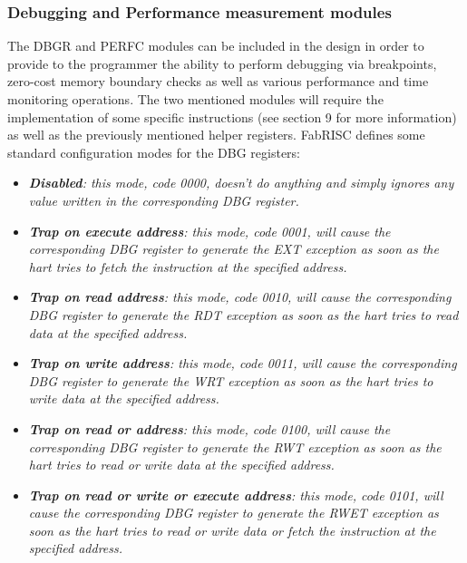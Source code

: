         \subsubsection{Debugging and Performance measurement modules}

            The DBGR and PERFC modules can be included in the design in order to provide to the programmer the ability to perform debugging via breakpoints, zero-cost memory boundary checks as well as various performance and time monitoring operations. The two mentioned modules will require the implementation of some specific instructions (see section 9 for more information) as well as the previously mentioned helper registers. FabRISC defines some standard configuration modes for the DBG registers:

            \begin{itemize}

                \item \textit{\textbf{Disabled}: this mode, code 0000, doesn't do anything and simply ignores any value written in the corresponding DBG register.}

                \item \textit{\textbf{Trap on execute address}: this mode, code 0001, will cause the corresponding DBG register to generate the EXT exception as soon as the hart tries to fetch the instruction at the specified address.}

                \item \textit{\textbf{Trap on read address}: this mode, code 0010, will cause the corresponding DBG register to generate the RDT exception as soon as the hart tries to read data at the specified address.}

                \item \textit{\textbf{Trap on write address}: this mode, code 0011, will cause the corresponding DBG register to generate the WRT exception as soon as the hart tries to write data at the specified address.}

                \item \textit{\textbf{Trap on read or address}: this mode, code 0100, will cause the corresponding DBG register to generate the RWT exception as soon as the hart tries to read or write data at the specified address.}

                \item \textit{\textbf{Trap on read or write or execute address}: this mode, code 0101, will cause the corresponding DBG register to generate the RWET exception as soon as the hart tries to read or write data or fetch the instruction at the specified address.}


\end{itemize}
